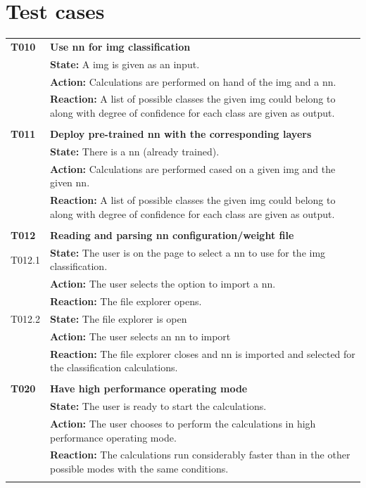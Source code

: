 \documentclass[parskip=full]{scrartcl}
\begin{document}
\section{Test cases}
\begin{tabular}{p{2cm}p{12cm}}
\textbf{T010} & \textbf{Use \gls{nn} for \gls{img} classification}\\
& \textbf{State:} A \gls{img} is given as an input.\\
& \textbf{Action:} Calculations are performed on hand of the \gls{img} and a \gls{nn}.\\
& \textbf{Reaction:} A list of possible classes the given \gls{img} could belong to along with degree of confidence for each class are given as output.\\
& \\

\textbf{T011} & \textbf{Deploy pre-trained \gls{nn} with the corresponding layers}\\
& \textbf{State:} There is a \gls{nn} (already trained).\\
& \textbf{Action:} Calculations are performed cased on a given \gls{img} and the given \gls{nn}.\\
& \textbf{Reaction:} A list of possible classes the given \gls{img} could belong to along with degree of confidence for each class are given as output.\\
& \\

\textbf{T012} & \textbf{Reading and parsing \gls{nn} configuration/weight file}\\
T012.1 & \textbf{State:}  The user is on the page to select a \gls{nn} to use for the \gls{img} classification.\\
& \textbf{Action:} The user selects the option to import a \gls{nn}.\\
& \textbf{Reaction:} The file explorer opens.\\
T012.2 & \textbf{State:} The file explorer is open\\
& \textbf{Action:} The user selects an \gls{nn} to import\\
& \textbf{Reaction:} The file explorer closes and \gls{nn} is imported and selected for the classification calculations.\\
& \\

\textbf{T020} & \textbf{Have high performance operating mode}\\
& \textbf{State:} The user is ready to start the calculations.\\
& \textbf{Action:} The user chooses to perform the calculations in high performance operating mode.\\
& \textbf{Reaction:} The calculations run considerably faster than in the other possible modes with the same conditions.\\
& \\


\end{tabular}
\end{document}
